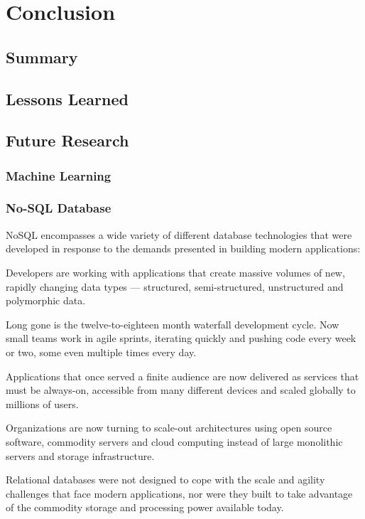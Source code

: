 \chapter{Conclusion}
\label{ChapterSeven}


\section{Summary}
\label{sec:Summary}

\section{Lessons Learned}
\label{sec:LessonsLearned}

\section{Future Research}
\label{sec:FutureResearch}

\subsection{Machine Learning}
\label{subsec:MachineLearning}

\subsection{No-SQL Database}
\label{subsec:NoSQLDatabase}
NoSQL encompasses a wide variety of different database technologies that were developed in response to the demands presented in building modern applications:

Developers are working with applications that create massive volumes of new, rapidly changing data types — structured, semi-structured, unstructured and polymorphic data.

Long gone is the twelve-to-eighteen month waterfall development cycle. Now small teams work in agile sprints, iterating quickly and pushing code every week or two, some even multiple times every day.

Applications that once served a finite audience are now delivered as services that must be always-on, accessible from many different devices and scaled globally to millions of users.

Organizations are now turning to scale-out architectures using open source software, commodity servers and cloud computing instead of large monolithic servers and storage infrastructure.

Relational databases were not designed to cope with the scale and agility challenges that face modern applications, nor were they built to take advantage of the commodity storage and processing power available today.

